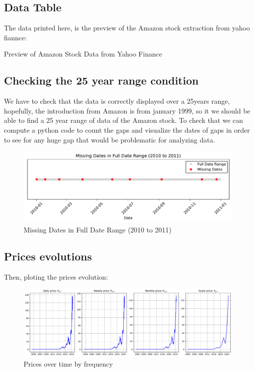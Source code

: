 \documentclass{article}
\begin{document}
\subsection{Data Table}
The data printed here, is the preview of the Amazon stock extraction from yahoo fiannce:
\begin{table}[h!]
    \centering
      
    \caption{Preview of Amazon Stock Data from Yahoo Finance}
    \label{tab:amazon_stock_preview}
\end{table}



\subsection{Checking the 25 year range condition}

We have to check that the data is correctly displayed over a 25years range, hopefully, 
the introduction from Amazon is from january 1999, so it we should be able to find a 25 year range
of data of the Amazon stock. To check that we can compute a python code to count the gaps and visualize 
the dates of gaps in order to see for any huge gap that would be problematic for analyzing data.

\begin{figure}[H]
    \centering
    \includegraphics[width=\textwidth]{Img/MissingDates(2010_to_2011).pdf}
    \caption{Missing Dates in Full Date Range (2010 to 2011)}
    \label{fig:missing_dates}
\end{figure}

\subsection{Prices evolutions}

Then, ploting the prices evolution:

\begin{figure}[H]
    \centering
    \includegraphics[width=\textwidth]{Img/prices_time.pdf}
    \caption{Prices over time by frequency}
    \label{fig:prices_time}
\end{figure}
\end{document}
